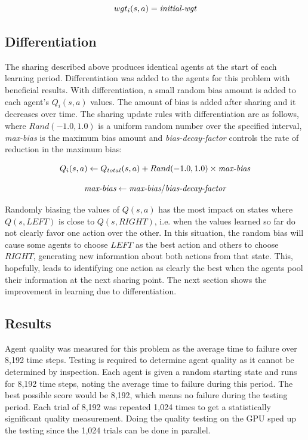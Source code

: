 \begin{equation}
wgt_i(s,a) = \mbox{\it initial-wgt}
\end{equation}

\subsection{Differentiation}
The sharing described above produces identical agents at the start of each learning period.  Differentiation was added to the agents for this problem with beneficial results.  With differentiation, a small random bias amount is added to each agent’s $Q_i(s,a)$ values.  The amount of bias is added after sharing and it decreases over time.  The sharing update rules with differentiation are as follows, where $Rand(-1.0,1.0)$ is a uniform random number over the specified interval, {\it max-bias} is the maximum bias amount and {\it bias-decay-factor} controls the rate of reduction in the maximum bias:

\begin{equation}
Q_i(s,a) \gets Q_{total}(s,a) + Rand(-1.0,1.0) \times \mbox{\it max-bias}
\end{equation}

\begin{equation}
\mbox{\it max-bias} \gets \mbox{\it max-bias} / \mbox{\it bias-decay-factor}
\end{equation}

Randomly biasing the values of $Q(s,a)$ has the most impact on states where $Q(s,LEFT)$ is close to $Q(s,RIGHT)$, i.e. when the values learned so far do not clearly favor one action over the other.  In this situation, the random bias will cause some agents to choose $LEFT$ as the best action and others to choose $RIGHT$, generating new information about both actions from that state.  This, hopefully, leads to identifying one action as clearly the best when the agents pool their information at the next sharing point.  The next section shows the improvement in learning due to differentiation.

\subsection{Results}
Agent quality was measured for this problem as the average time to failure over 8,192 time steps.  Testing is required to determine agent quality as it cannot be determined by inspection.  Each agent is given a random starting state and runs for 8,192 time steps, noting the average time to failure during this period.  The best possible score would be 8,192, which means no failure during the testing period.  Each trial of 8,192 was repeated 1,024 times to get a statistically significant quality measurement.  Doing the quality testing on the GPU sped up the testing since the 1,024 trials can be done in parallel.


